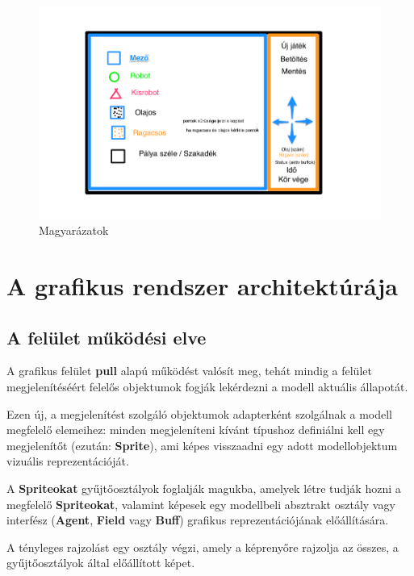 \clearpage

\begin{figure}[h!]
\begin{center}
\includegraphics[width=17cm]{chapters/chapter11/3.png}
\caption{Magyarázatok}
\label{fig:Grafikus3}
\end{center}
\end{figure}

\section{A grafikus rendszer architektúrája}

\subsection{A felület működési elve}
\noindent A grafikus felület \textbf{pull} alapú működést valósít meg, tehát mindig a felület megjelenítéséért felelős objektumok fogják lekérdezni a modell aktuális állapotát. 

\noindent Ezen új, a megjelenítést szolgáló objektumok adapterként szolgálnak a modell megfelelő elemeihez: minden megjeleníteni kívánt típushoz definiálni kell egy megjelenítőt (ezután: \textbf{Sprite}), ami képes visszaadni egy adott modellobjektum vizuális reprezentációját. 

\noindent A \textbf{Spriteokat} gyűjtőosztályok
foglalják magukba, amelyek létre tudják hozni a megfelelő \textbf{Spriteokat}, valamint képesek egy modellbeli absztrakt osztály vagy interfész (\textbf{Agent}, \textbf{Field} vagy \textbf{Buff}) grafikus reprezentációjának előállítására. 

\noindent A tényleges rajzolást egy osztály végzi, amely a képrenyőre rajzolja az összes, a gyűjtőosztályok által előállított képet.


